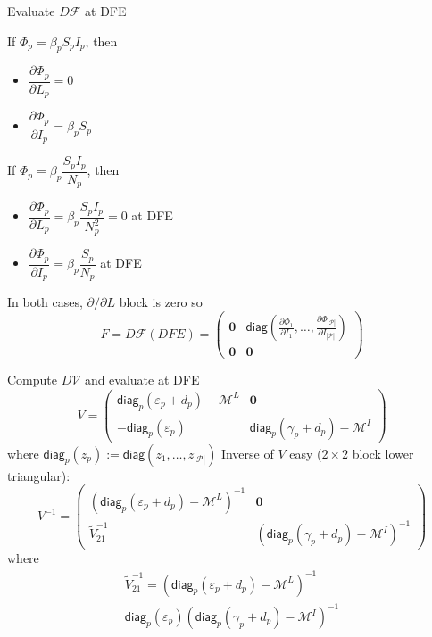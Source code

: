 \documentclass[aspectratio=169]{beamer}\usepackage[]{graphicx}\usepackage[]{xcolor}
\begin{document}
\begin{frame}{Evaluate $D\mathcal{F}$ at DFE}
	\begin{minipage}[t]{0.45\textwidth}
		If $\Phi_p=\beta_pS_pI_p$, then
		\begin{itemize}
			\item $\dfrac{\partial\Phi_p}{\partial L_p}=0$
			\item $\dfrac{\partial\Phi_p}{\partial I_p}=\beta_pS_p$
		\end{itemize}
	\end{minipage}
	\begin{minipage}[t]{0.45\textwidth}
		If $\Phi_p=\beta_p\dfrac{S_pI_p}{N_p}$, then
		\begin{itemize}
			\item $\dfrac{\partial\Phi_p}{\partial L_p}=\beta_p\dfrac{S_pI_p}{N_p^2}=0$ at DFE
			\item $\dfrac{\partial\Phi_p}{\partial I_p}=\beta_p\dfrac{S_p}{N_p}$ at DFE
		\end{itemize}
	\end{minipage}
	\vfill
In both cases, $\partial/\partial L$ block is zero so
$$
F=D\mathcal{F}(DFE)=
\begin{pmatrix}
\mathbf{0} & \mathsf{diag}\left(
\frac{\partial\Phi_1}{\partial I_1},\ldots,\frac{\partial\Phi_{|\mathcal{P}|}}{\partial I_{|\mathcal{P}|}}\right) \\
\mathbf{0} & \mathbf{0}
\end{pmatrix}
$$
\end{frame}

\begin{frame}{Compute $D\mathcal{V}$ and evaluate at DFE}
$$
V=
\begin{pmatrix}
\mathsf{diag}_p(\varepsilon_p+d_p)-\mathcal{M}^L & \mathbf{0} \\
-\mathsf{diag}_p(\varepsilon_p) & \mathsf{diag}_p(\gamma_p+d_p)-\mathcal{M}^I
\end{pmatrix}
$$
where $\mathsf{diag}_p(z_p):=\mathsf{diag}(z_1,\ldots,z_{|\mathcal{P}|})$
\vfill
Inverse of $V$ easy ($2\times 2$ block lower triangular):
$$
V^{-1}
=
\begin{pmatrix}
\left(\mathsf{diag}_p(\varepsilon_p+d_p)-\mathcal{M}^L\right)^{-1} & \mathbf{0} \\
\tilde V_{21}^{-1} & \left(\mathsf{diag}_p(\gamma_p+d_p)-\mathcal{M}^I\right)^{-1}
\end{pmatrix}
$$
where
\begin{multline*}
	\tilde V_{21}^{-1}=
	\left(\mathsf{diag}_p(\varepsilon_p+d_p)-\mathcal{M}^L\right)^{-1}\\ 
	\mathsf{diag}_p(\varepsilon_p)
	\left(\mathsf{diag}_p(\gamma_p+d_p)-\mathcal{M}^I\right)^{-1}		
\end{multline*}
\end{frame}
\end{document}
